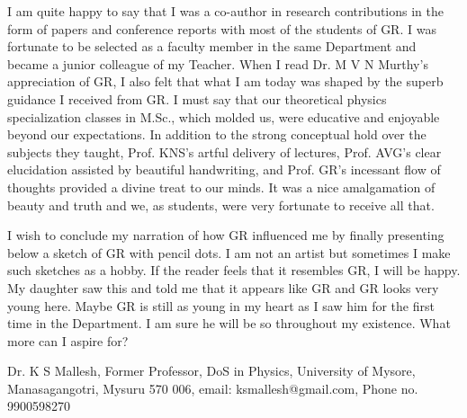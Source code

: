 I am quite happy to say that I was a co-author in research contributions in the form of papers and conference reports with most of the students of GR. I was fortunate to be selected as a faculty member in the same Department and became a junior colleague of my Teacher. When I read Dr. M V N Murthy's appreciation of GR, I also felt that what I am today was shaped by the superb guidance I received from GR. I must say that our theoretical physics specialization classes in M.Sc., which molded us, were educative and enjoyable beyond our expectations. In addition to the strong conceptual hold over the subjects they taught, Prof. KNS's artful delivery of lectures, Prof. AVG's clear elucidation assisted by beautiful handwriting, and Prof. GR's incessant flow of thoughts provided a divine treat to our minds. It was a nice amalgamation of beauty and truth and we, as students, were very fortunate to receive all that.

I wish to conclude my narration of how GR influenced me by finally presenting below a sketch of GR with pencil dots. I am not an artist but sometimes I make such sketches as a hobby. If the reader feels that it resembles GR, I will be happy. My daughter saw this and told me that it appears like GR and GR looks very young here. Maybe GR is still as young in my heart as I saw him for the first time in the Department. I am sure he will be so throughout my existence. What more can I aspire for?

\begin{figure}[H]
\end{figure}


Dr. K S Mallesh, Former Professor, DoS in Physics, University of Mysore, Manasagangotri, Mysuru 570 006, email: ksmallesh@gmail.com, Phone no. 9900598270
